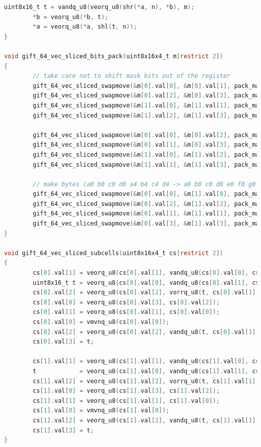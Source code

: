 \documentclass[12pt]{report}
\begin{document}
\begin{lstlisting}[language=c, caption={gift\_vec\_sliced.c}]
        uint8x16_t t = vandq_u8(veorq_u8(shr(*a, n), *b), m);
        *b = veorq_u8(*b, t);
        *a = veorq_u8(*a, shl(t, n));
}

void gift_64_vec_sliced_bits_pack(uint8x16x4_t m[restrict 2])
{
        // take care not to shift mask bits out of the register
        gift_64_vec_sliced_swapmove(&m[0].val[0], &m[0].val[1], pack_mask_0, 1);
        gift_64_vec_sliced_swapmove(&m[0].val[2], &m[0].val[3], pack_mask_0, 1);
        gift_64_vec_sliced_swapmove(&m[1].val[0], &m[1].val[1], pack_mask_0, 1);
        gift_64_vec_sliced_swapmove(&m[1].val[2], &m[1].val[3], pack_mask_0, 1);

        gift_64_vec_sliced_swapmove(&m[0].val[0], &m[0].val[2], pack_mask_1, 2);
        gift_64_vec_sliced_swapmove(&m[0].val[1], &m[0].val[3], pack_mask_1, 2);
        gift_64_vec_sliced_swapmove(&m[1].val[0], &m[1].val[2], pack_mask_1, 2);
        gift_64_vec_sliced_swapmove(&m[1].val[1], &m[1].val[3], pack_mask_1, 2);

        // make bytes (a0 b0 c0 d0 a4 b4 c4 d4 -> a0 b0 c0 d0 e0 f0 g0 h0)
        gift_64_vec_sliced_swapmove(&m[0].val[0], &m[1].val[0], pack_mask_2, 4);
        gift_64_vec_sliced_swapmove(&m[0].val[2], &m[1].val[2], pack_mask_2, 4);
        gift_64_vec_sliced_swapmove(&m[0].val[1], &m[1].val[1], pack_mask_2, 4);
        gift_64_vec_sliced_swapmove(&m[0].val[3], &m[1].val[3], pack_mask_2, 4);
}

void gift_64_vec_sliced_subcells(uint8x16x4_t cs[restrict 2])
{
        cs[0].val[1] = veorq_u8(cs[0].val[1], vandq_u8(cs[0].val[0], cs[0].val[2]));
        uint8x16_t t = veorq_u8(cs[0].val[0], vandq_u8(cs[0].val[1], cs[0].val[3]));
        cs[0].val[2] = veorq_u8(cs[0].val[2], vorrq_u8(t, cs[0].val[1]));
        cs[0].val[0] = veorq_u8(cs[0].val[3], cs[0].val[2]);
        cs[0].val[1] = veorq_u8(cs[0].val[1], cs[0].val[0]);
        cs[0].val[0] = vmvnq_u8(cs[0].val[0]);
        cs[0].val[2] = veorq_u8(cs[0].val[2], vandq_u8(t, cs[0].val[1]));
        cs[0].val[3] = t;

        cs[1].val[1] = veorq_u8(cs[1].val[1], vandq_u8(cs[1].val[0], cs[1].val[2]));
        t            = veorq_u8(cs[1].val[0], vandq_u8(cs[1].val[1], cs[1].val[3]));
        cs[1].val[2] = veorq_u8(cs[1].val[2], vorrq_u8(t, cs[1].val[1]));
        cs[1].val[0] = veorq_u8(cs[1].val[3], cs[1].val[2]);
        cs[1].val[1] = veorq_u8(cs[1].val[1], cs[1].val[0]);
        cs[1].val[0] = vmvnq_u8(cs[1].val[0]);
        cs[1].val[2] = veorq_u8(cs[1].val[2], vandq_u8(t, cs[1].val[1]));
        cs[1].val[3] = t;
}


\end{lstlisting}
\end{document}
